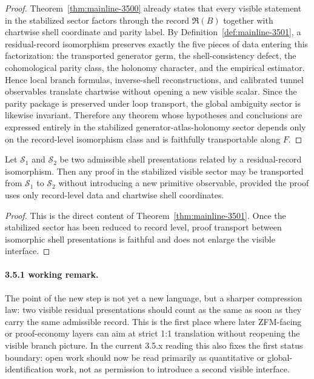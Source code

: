 \begin{proof}
Theorem~\ref{thm:mainline-3500} already states that every visible statement in the stabilized sector factors through the record $\mathfrak R(B)$ together with chartwise shell coordinate and parity label. By Definition~\ref{def:mainline-3501}, a residual-record isomorphism preserves exactly the five pieces of data entering this factorization: the transported generator germ, the shell-consistency defect, the cohomological parity class, the holonomy character, and the empirical estimator. Hence local branch formulas, inverse-shell reconstructions, and calibrated tunnel observables translate chartwise without opening a new visible scalar. Since the parity package is preserved under loop transport, the global ambiguity sector is likewise invariant. Therefore any theorem whose hypotheses and conclusions are expressed entirely in the stabilized generator-atlas-holonomy sector depends only on the record-level isomorphism class and is faithfully transportable along $F$.
\end{proof}

\begin{corollary}
\label{cor:mainline-3501}
Let $\mathcal S_1$ and $\mathcal S_2$ be two admissible shell presentations related by a residual-record isomorphism. Then any proof in the stabilized visible sector may be transported from $\mathcal S_1$ to $\mathcal S_2$ without introducing a new primitive observable, provided the proof uses only record-level data and chartwise shell coordinates.
\end{corollary}

\begin{proof}
This is the direct content of Theorem~\ref{thm:mainline-3501}. Once the stabilized sector has been reduced to record level, proof transport between isomorphic shell presentations is faithful and does not enlarge the visible interface.
\end{proof}

\paragraph{3.5.1 working remark.}
The point of the new step is not yet a new language, but a sharper compression law: two visible residual presentations should count as the same as soon as they carry the same admissible record. This is the first place where later ZFM-facing or proof-economy layers can aim at strict 1:1 translation without reopening the visible branch picture. In the current 3.5.x reading this also fixes the first status boundary: open work should now be read primarily as quantitative or global-identification work, not as permission to introduce a second visible interface.


